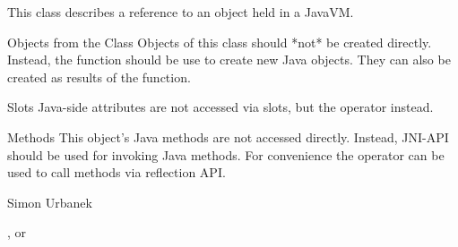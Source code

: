 \begin{Description}\relax
This class describes a reference to an object held in a JavaVM.
\end{Description}
\begin{Section}{Objects from the Class}
Objects of this class should *not* be created directly. Instead, the function  should be use to create new Java objects. They can also be created as results of the  function.
\end{Section}
\begin{Section}{Slots}
Java-side attributes are not accessed via slots, but the \code{\$} operator instead.
\end{Section}
\begin{Section}{Methods}
This object's Java methods are not accessed directly. Instead,  JNI-API should be used for invoking Java methods. For convenience the \code{\$} operator can be used to call methods via reflection API.
\end{Section}
\begin{Author}\relax
Simon Urbanek
\end{Author}
\begin{SeeAlso}\relax
{},   or 
\end{SeeAlso}


